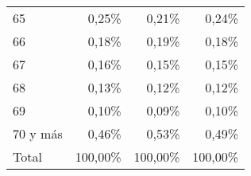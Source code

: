 \begin{tabular}{llll}
\multicolumn{1}{l}{\hspace{1em}65} &
  \multicolumn{1}{|r}{0,25\%} &
  \multicolumn{1}{r}{0,21\%} &
  \multicolumn{1}{r}{0,24\%} \\
\multicolumn{1}{l}{\hspace{1em}66} &
  \multicolumn{1}{|r}{0,18\%} &
  \multicolumn{1}{r}{0,19\%} &
  \multicolumn{1}{r}{0,18\%} \\
\multicolumn{1}{l}{\hspace{1em}67} &
  \multicolumn{1}{|r}{0,16\%} &
  \multicolumn{1}{r}{0,15\%} &
  \multicolumn{1}{r}{0,15\%} \\
\multicolumn{1}{l}{\hspace{1em}68} &
  \multicolumn{1}{|r}{0,13\%} &
  \multicolumn{1}{r}{0,12\%} &
  \multicolumn{1}{r}{0,12\%} \\
\multicolumn{1}{l}{\hspace{1em}69} &
  \multicolumn{1}{|r}{0,10\%} &
  \multicolumn{1}{r}{0,09\%} &
  \multicolumn{1}{r}{0,10\%} \\
\multicolumn{1}{l}{\hspace{1em}70 y más} &
  \multicolumn{1}{|r}{0,46\%} &
  \multicolumn{1}{r}{0,53\%} &
  \multicolumn{1}{r}{0,49\%} \\
\multicolumn{1}{l}{\hspace{1em}Total} &
  \multicolumn{1}{|r}{100,00\%} &
  \multicolumn{1}{r}{100,00\%} &
  \multicolumn{1}{r}{100,00\%} \\
\cline{1-4}
\end{tabular}
